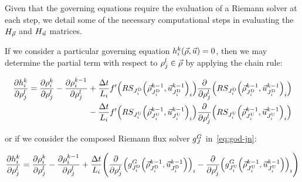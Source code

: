 		Given that the governing equations require the evaluation of a Riemann
		solver at each step, we detail some of the necessary computational
		steps in evaluating the $H_{\vec{\rho}}$ and $H_{\vec{u}}$ matrices. 
				
		If we consider a particular governing equation $\syseq_{\link}^{\tind}\left(\state,\control\right)=0$,
		then we may determine the partial term with respect to $\rho_{j}^{l}\in\vec{\rho}$
		by applying the chain rule:
				
		\begin{align}
			\pfrac{\syseq_{\link}^{\tind}}{\discrete jl}=\pfrac{\discrete{\link}{\tind}}{\discrete jl}-\pfrac{\discrete{\link}{\tind-1}}{\discrete jl} & +\frac{\Delta t}{L_{i}}f'\left(\RS_{\jdown{\link}}\left(\juncstate{\jdown{\link}}{\tind-1},\junccon{\jdown{\link}}{\tind-1}\right)_{\link}\right)\pfrac{}{\discrete jl}\left(\RS_{\jdown{\link}}\left(\juncstate{\jdown{\link}}{\tind-1},\junccon{\jdown{\link}}{\tind-1}\right)_{\link}\right)\label{eq:dhdufull} \\
			                                                                                                                                           & -\frac{\Delta t}{L_{i}}f'\left(\RS_{\jup{\link}}\left(\juncstate{\jup{\link}}{\tind-1},\junccon{\jup{\link}}{\tind-1}\right)_{\link}\right)\pfrac{}{\discrete jl}\left(\RS_{\jup{\link}}\left(\juncstate{\jup{\link}}{\tind-1},\junccon{\jup{\link}}{\tind-1}\right)_{\link}\right)\nonumber                       
		\end{align}
				
				
		or if we consider the composed Riemann flux solver $g^{G}_{J}$ in~\eqref{eq:god-jn}:
				
		\begin{equation}
			\pfrac{\syseq_{\link}^{\tind}}{\discrete jl}=\pfrac{\discrete{\link}{\tind}}{\discrete jl}-\pfrac{\discrete{\link}{\tind-1}}{\discrete jl}+\frac{\Delta t}{L_{i}}\left(\pfrac{}{\discrete jl}\left(\god_{\jdown{\link}}\left(\juncstate{\jdown{\link}}{\tind-1},\junccon{\jdown{\link}}{\tind-1}\right)\right)_{\link}-\pfrac{}{\discrete jl}\left(\god_{\jup{\link}}\left(\juncstate{\jup{\link}}{\tind-1},\junccon{\jup{\link}}{\tind-1}\right)\right)_{\link}\right)\label{eq:dhdugod}
		\end{equation}
				
